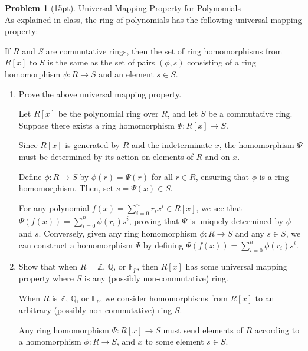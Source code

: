 \documentclass[12pt]{article}
\theoremstyle{definition}
\newtheorem{problem}{Problem}
\begin{document}
\begin{problem}[15pt] Universal Mapping Property for Polynomials\\
      As explained in class, the ring of polynomials has the following universal mapping property:

      If $R$ and $S$ are commutative rings, then the set of ring homomorphisms from $R[x]$ to $S$
      is the same as the set of pairs $(\phi, s)$ consisting of a ring homomorphism 
      $\phi : R \longrightarrow S$ and an element $s \in S$.
      \begin{enumerate}[label=\arabic*.]
            \item Prove the above universal mapping property.
            
            \begin{solution}
            Let $R[x]$ be the polynomial ring over $R$, and let $S$ be a commutative ring. Suppose there exists a ring homomorphism $\Psi: R[x] \to S$. 
            
            Since $R[x]$ is generated by $R$ and the indeterminate $x$, the homomorphism $\Psi$ must be determined by its action on elements of $R$ and on $x$. 
            
            Define $\phi: R \to S$ by $\phi(r) = \Psi(r)$ for all $r \in R$, ensuring that $\phi$ is a ring homomorphism. Then, set $s = \Psi(x) \in S$.
            
            For any polynomial $f(x) = \sum_{i=0}^{n} r_i x^i \in R[x]$, we see that $\Psi(f(x)) = \sum_{i=0}^{n} \phi(r_i) s^i$, proving that $\Psi$ is uniquely determined by $\phi$ and $s$. Conversely, given any ring homomorphism $\phi: R \to S$ and any $s \in S$, we can construct a homomorphism $\Psi$ by defining $\Psi(f(x)) = \sum_{i=0}^{n} \phi(r_i) s^i$.
            \end{solution}

            \item Show that when $R = \mathbb{Z}$, $\mathbb{Q}$, or $\mathbb{F}_p$, then $R[x]$ has
                  some universal mapping property where $S$ is any (possibly non-commutative) ring.

            \begin{solution}
            When $R$ is $\mathbb{Z}$, $\mathbb{Q}$, or $\mathbb{F}_p$, we consider homomorphisms from $R[x]$ to an arbitrary (possibly non-commutative) ring $S$.
            
            Any ring homomorphism $\Psi: R[x] \to S$ must send elements of $R$ according to a homomorphism $\phi: R \to S$, and $x$ to some element $s \in S$.
            

\end{solution}
\end{enumerate}
\end{problem}
\end{document}
